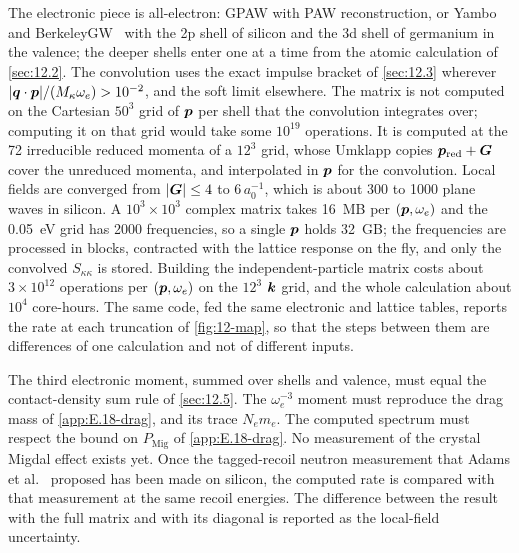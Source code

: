 The electronic piece is all-electron: GPAW with PAW reconstruction, or Yambo~\cite{sangalli2019many} and BerkeleyGW~\cite{deslippe2012berkeleygw} with the 2p shell of silicon and the 3d shell of germanium in the valence; the deeper shells enter one at a time from the atomic calculation of \cref{sec:12.2}. The convolution uses the exact impulse bracket of \cref{sec:12.3} wherever $|\bm{q}\cdot\bm{p}|/(M_\kappa\omega_e) > 10^{-2}$, and the soft limit elsewhere. The matrix is not computed on the Cartesian $50^3$ grid of $\bm{p}$ per shell that the convolution integrates over; computing it on that grid would take some $10^{19}$ operations. It is computed at the 72 irreducible reduced momenta of a $12^3$ grid, whose Umklapp copies $\bm{p}_{\mathrm{red}} + \bm{G}$ cover the unreduced momenta, and interpolated in $\bm{p}$ for the convolution. Local fields are converged from $|\bm{G}| \le 4$ to $6\,a_0^{-1}$, which is about 300 to 1000 plane waves in silicon. A $10^3\times10^3$ complex matrix takes \SI{16}{MB} per $(\bm{p},\omega_e)$ and the \SI{0.05}{eV} grid has 2000 frequencies, so a single $\bm{p}$ holds \SI{32}{GB}; the frequencies are processed in blocks, contracted with the lattice response on the fly, and only the convolved $S_{\kappa\kappa}$ is stored. Building the independent-particle matrix costs about $3\times10^{12}$ operations per $(\bm{p},\omega_e)$ on the $12^3$ $\bm{k}$ grid, and the whole calculation about $10^4$ core-hours. The same code, fed the same electronic and lattice tables, reports the rate at each truncation of \cref{fig:12-map}, so that the steps between them are differences of one calculation and not of different inputs.

The third electronic moment, summed over shells and valence, must equal the contact-density sum rule of \cref{sec:12.5}. The $\omega_e^{-3}$ moment must reproduce the drag mass of \cref{app:E.18-drag}, and its trace $N_e m_e$. The computed spectrum must respect the bound on $P_{\mathrm{Mig}}$ of \cref{app:E.18-drag}. No measurement of the crystal Migdal effect exists yet. Once the tagged-recoil neutron measurement that Adams et al.~\cite{adams2023measuring} proposed has been made on silicon, the computed rate is compared with that measurement at the same recoil energies. The difference between the result with the full matrix and with its diagonal is reported as the local-field uncertainty.

